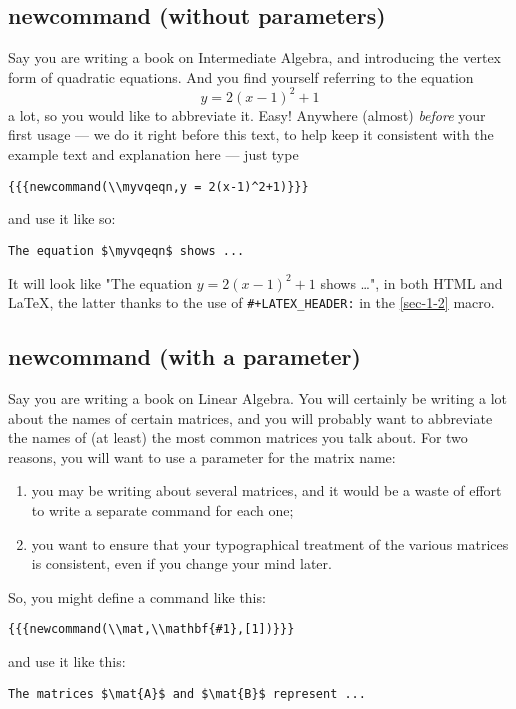 \documentclass[11pt]{article}
\newcommand{\myvqeqn}{y = 2(x-1)^2+1}
\newcommand{\mat}[1]{\mathbf{#1}}
\begin{document}
\subsection{newcommand (without parameters)}
\label{sec-4-2}


Say you are writing a book on Intermediate Algebra, and introducing
the vertex form of quadratic equations.  And you find yourself
referring to the equation \[\myvqeqn\] a lot, so you would like to
abbreviate it.  Easy!  Anywhere (almost) \emph{before} your first usage ---
we do it right before this text, to help keep it consistent with the
example text and explanation here --- just type
\begin{verbatim}
{{{newcommand(\\myvqeqn,y = 2(x-1)^2+1)}}}
\end{verbatim}
and use it like so:
\begin{verbatim}
The equation $\myvqeqn$ shows ...
\end{verbatim}
It will look like "The equation $\myvqeqn$ shows \ldots{}", in both HTML
and \LaTeX{}, the latter thanks to the use of \verb~#+LATEX_HEADER:~ in the
\ref{sec-1-2} macro.

\subsection{newcommand (with a parameter)}
\label{sec-4-3}


Say you are writing a book on Linear Algebra.  You will certainly be
writing a lot about the names of certain matrices, and you will
probably want to abbreviate the names of (at least) the most common
matrices you talk about.  For two reasons, you will want to use a
parameter for the matrix name:

\begin{enumerate}
\item you may be writing about several matrices, and it would be a waste
of effort to write a separate command for each one;
\item you want to ensure that your typographical treatment of the various
matrices is consistent, even if you change your mind later.
\end{enumerate}

So, you might define a command like this:
\begin{verbatim}
{{{newcommand(\\mat,\\mathbf{#1},[1])}}}
\end{verbatim}
and use it like this:
\begin{verbatim}
The matrices $\mat{A}$ and $\mat{B}$ represent ...
\end{verbatim}
\end{document}
